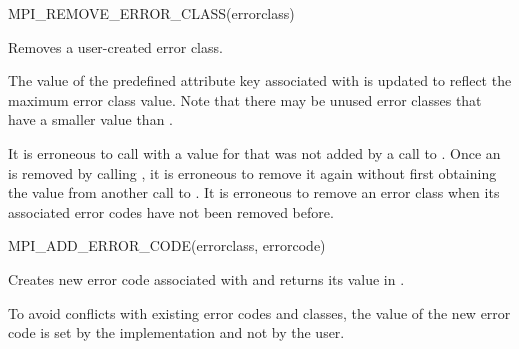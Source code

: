 \begin{funcdef}{MPI\_REMOVE\_ERROR\_CLASS}{(\mbox{errorclass})}
\end{funcdef}

Removes a user-created error class.

The value of the predefined attribute key  associated with
 is updated to reflect the maximum error class value. Note that there may be
unused error classes that have a smaller value than .

It is erroneous to call  with a value for
 that was not added by a call to . Once an
 is removed by calling , it is erroneous to
remove it again without first obtaining the value from another call to .
%
It is erroneous to remove an error class when its associated error codes have not been removed before.

\begin{funcdef}{MPI\_ADD\_ERROR\_CODE}{(\mbox{errorclass}, \mbox{errorcode})}
\end{funcdef}

Creates new error code associated with
 and returns its value in .

\begin{rationale}
To avoid conflicts with existing error codes and classes, the value
of the new error code is set by the implementation and not by the
user. 
\end{rationale}


